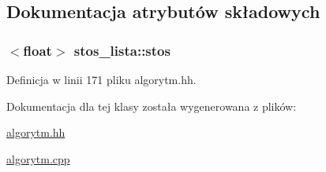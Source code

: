 \subsection{Dokumentacja atrybutów składowych}
\hypertarget{classstos__lista_a94fc88e5b40c7a44e2e34a6f0441853f}{
\subsubsection[{stos}]{$<$float$>$ stos\-\_\-lista\-::stos\hspace{0.3cm}{\ttfamily [private]}}}\label{classstos__lista_a94fc88e5b40c7a44e2e34a6f0441853f}


Definicja w linii 171 pliku algorytm.\-hh.



Dokumentacja dla tej klasy została wygenerowana z plików\-:\begin{DoxyCompactItemize}
\item 
\hyperlink{algorytm_8hh}{algorytm.\-hh}\item 
\hyperlink{algorytm_8cpp}{algorytm.\-cpp}\end{DoxyCompactItemize}
